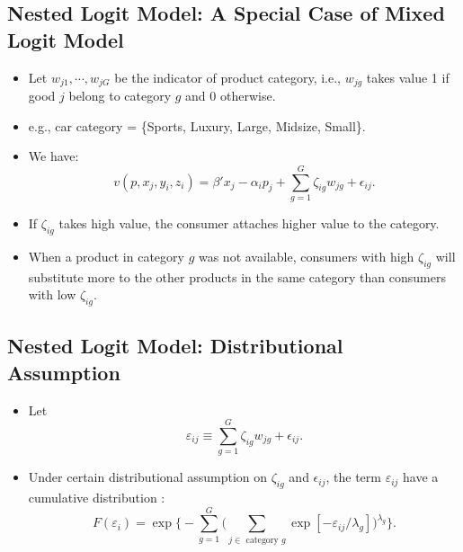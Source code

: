 \documentclass[
]{book}
\providecommand{\tightlist}{%
  \setlength{\itemsep}{0pt}\setlength{\parskip}{0pt}}
\begin{document}
\hypertarget{nested-logit-model-a-special-case-of-mixed-logit-model}{%
\subsection{Nested Logit Model: A Special Case of Mixed Logit Model}\label{nested-logit-model-a-special-case-of-mixed-logit-model}}

\begin{itemize}
\tightlist
\item
  Let \(w_{j1}, \cdots, w_{jG}\) be the indicator of product category, i.e., \(w_{jg}\) takes value 1 if good \(j\) belong to category \(g\) and 0 otherwise.
\item
  e.g., car category = \{Sports, Luxury, Large, Midsize, Small\}.
\item
  We have:
  \begin{equation}
  v(p, x_j, y_i, z_i) = \beta'x_j - \alpha_i p_j + \sum_{g = 1}^G \zeta_{ig} w_{jg} + \epsilon_{ij}.
  \end{equation}
\item
  If \(\zeta_{ig}\) takes high value, the consumer attaches higher value to the category.
\item
  When a product in category \(g\) was not available, consumers with high \(\zeta_{ig}\) will substitute more to the other products in the same category than consumers with low \(\zeta_{ig}\).
\end{itemize}

\hypertarget{nested-logit-model-distributional-assumption}{%
\subsection{Nested Logit Model: Distributional Assumption}\label{nested-logit-model-distributional-assumption}}

\begin{itemize}
\tightlist
\item
  Let
  \begin{equation}
  \varepsilon_{ij} \equiv \sum_{g = 1}^G \zeta_{ig} w_{jg} + \epsilon_{ij}.
  \end{equation}
\item
  Under certain distributional assumption on \(\zeta_{ig}\) and \(\epsilon_{ij}\), the term \(\varepsilon_{ij}\) have a cumulative distribution \citep{Cardell1997}:
  \begin{equation}
  F(\varepsilon_i) = \exp\Bigg\{- \sum_{g = 1}^G \Bigg(\sum_{j \in \text{   category   } g} \exp[-\varepsilon_{ij}/\lambda_g] \Bigg)^{\lambda_g}  \Bigg\}.
  \end{equation}
\end{itemize}
\end{document}
